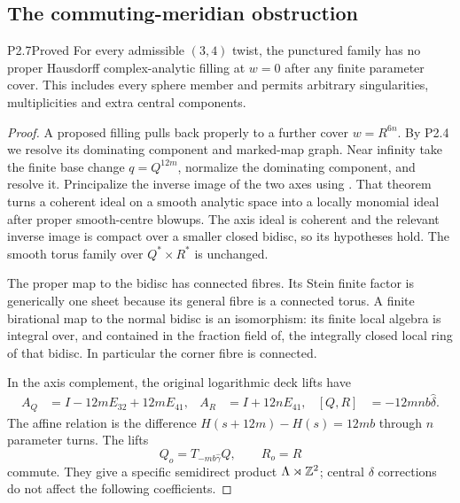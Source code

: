 \subsection{The commuting-meridian obstruction}
\begin{statement}{P2.7}{Proved}
For every admissible $(3,4)$ twist, the punctured family has no proper Hausdorff complex-analytic filling at $w=0$ after any finite parameter cover. This includes every sphere member and permits arbitrary singularities, multiplicities and extra central components.
\end{statement}
\begin{proof}
A proposed filling pulls back properly to a further cover $w=R^{6n}$. By P2.4 we resolve its dominating component and marked-map graph. Near infinity take the finite base change $q=Q^{12m}$, normalize the dominating component, and resolve it. Principalize the inverse image of the two axes using \cite[Theorem 1.10 and its analytic extension in Section 13]{BM97}. That theorem turns a coherent ideal on a smooth analytic space into a locally monomial ideal after proper smooth-centre blowups. The axis ideal is coherent and the relevant inverse image is compact over a smaller closed bidisc, so its hypotheses hold. The smooth torus family over $Q^*\times R^*$ is unchanged.

The proper map to the bidisc has connected fibres. Its Stein finite factor is generically one sheet because its general fibre is a connected torus. A finite birational map to the normal bidisc is an isomorphism: its finite local algebra is integral over, and contained in the fraction field of, the integrally closed local ring of that bidisc. In particular the corner fibre is connected.

In the axis complement, the original logarithmic deck lifts have
\begin{align*}
 A_Q&=I-12mE_{32}+12mE_{41},&
 A_R&=I+12nE_{41},&
 [Q,R]&=-12mnb\widehat\delta.
\end{align*}
The affine relation is the difference $H(s+12m)-H(s)=12mb$ through $n$ parameter turns. The lifts
\[
 Q_o=T_{-mb\widehat\gamma}Q,\qquad R_o=R
\]
commute. They give a specific semidirect product $\Lambda\rtimes\mathbb Z^2$; central $\delta$ corrections do not affect the following coefficients.


\end{proof}
